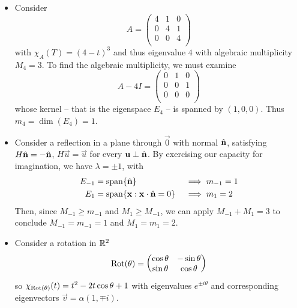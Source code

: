 \documentclass{../../template/note}
\begin{document}
    \begin{example}
        \begin{itemize}
            \item Consider
            \[
                A = \begin{pmatrix}
                 4 & 1 & 0 \\
                 0 & 4 & 1 \\
                 0 & 0 & 4 \\
                \end{pmatrix}
            \]
            with \(\chi_A(T) = (4-t)^3\) and thus eigenvalue \(4\) with algebraic multiplicity \(M_4 = 3\). To find the algebraic multiplicity, we must examine
            \[
                A - 4I = \begin{pmatrix}
                 0 & 1 & 0 \\
                 0 & 0 & 1 \\
                 0 & 0 & 0 \\
                \end{pmatrix}
            \]
            whose kernel -- that is the eigenspace \(E_4\) -- is spanned by \((1, 0, 0)\). Thus \(m_4 = \dim(E_4) = 1\).
            \item Consider a reflection in a plane through \(\vec 0\) with normal \(\hvec n\), satisfying \(H \hvec n = -\hvec n\), \(H \vec u = \vec u\) for every \(\vec u \perp \hvec n\). By exercising our capacity for imagination, we have \(\lambda = \pm 1\), with
            \begin{align*}
                E_{-1} &= \Span \{\hvec n\} &&\implies m_{-1} = 1\\
                E_1 &= \Span \{\vec x : \vec x \cdot \hvec n = 0\} &&\implies m_1 = 2
            \end{align*}
            Then, since \(M_{-1} \geq m_{-1}\) and \(M_1 \geq M_{-1}\), we can apply \(M_{-1} + M_1 = 3\) to conclude \(M_{-1} = m_{-1} = 1\) and \(M_1 = m_1 = 2\).
            \item Consider a rotation in \(\mathbb R^2\)
            \[
                \operatorname{Rot}(\theta) = \begin{pmatrix}
                 \cos \theta & -\sin \theta \\
                 \sin \theta & \cos \theta \\
                \end{pmatrix}
            \]
            so \(\chi_{\operatorname{Rot}(\theta)}(t) = t^2 - 2t \cos \theta + 1\) with eigenvalues \(e^{\pm i \theta}\) and corresponding eigenvectors \(\vec v = \alpha (1, \mp i)\).

\end{itemize}
\end{example}
\end{document}

